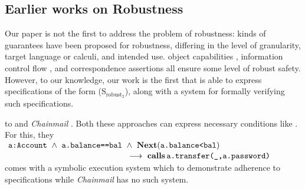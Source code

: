 {%
\vspace{.04in}
 
 \subsection{Earlier works on Robustness} 
Our paper is not the first   to address the problem of robustness:
 { 
kinds of} guarantees have been proposed for  robustness, differing in the level 
of granularity,   target  language or calculi, and intended use. 
object capabilities  \cite{MillerPhD, dd, threoremsFreeSep}, 
information control flow \cite{Zdancewic:Myers:01,noninteferenceOS}, 
and correspondence assertions \cite{Maffeis:aiamb:thesis00}
all
ensure some level of robust safety. 
{However, to our knowledge, 
our work is the first that is able to 
express specifications of the form (S$_{\text{robust}_2}$), along with a system
for formally verifying such specifications.}

 to  {} \cite{VerX} and  \emph{Chainmail} \cite{FASE}.
Both these approaches can express necessary conditions
  like \SrobustA. For this, they  
\\
 $\strut ~ \strut  \prg{a:Account} \ \wedge\ \prg{a.balance==bal}  \ \wedge\ \textbf{Next}(\prg{a.balance<bal}) $\\
 $\strut ~ \hspace{2in} \strut \strut \strut \longrightarrow\    \textbf{calls}\, {\texttt{a.transfer(\_,a.password)}}$
 \\
 {} comes with a symbolic 
  execution system which to demonstrate adherence to  specifications while  \emph{Chainmail}  has no such system.
  
}
